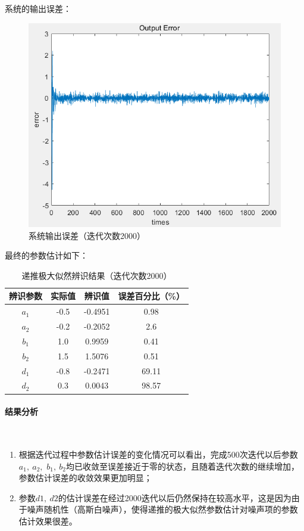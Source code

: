 \documentclass[UTF8]{article}
\begin{document}
系统的输出误差：
\begin{figure}[H]
    \centering %
    \includegraphics[width=.8\textwidth]{figure/递推极大似然-系统输出误差（迭代次数2000）.png} 
    \caption{系统输出误差（迭代次数2000）} %
\end{figure}

最终的参数估计如下：
\begin{table}[H] %
\centering %
\begin{tabular}{cccc} %
    \toprule %
    辨识参数 & 实际值 & 辨识值 & 误差百分比（\%） \\
    \midrule %
    $a_1$ & -0.5 & -0.4951 & 0.98 \\
    $a_2$ & -0.2 & -0.2052 & 2.6 \\
    $b_1$ & 1.0 & 0.9959 & 0.41 \\
    $b_2$ & 1.5 & 1.5076 & 0.51 \\
    $d_1$ & -0.8 & -0.2471 & 69.11 \\ 
    $d_2$ & 0.3 & 0.0043 & 98.57 \\
    \bottomrule %
\end{tabular}
\caption{递推极大似然辨识结果（迭代次数2000）} %
\end{table}

\paragraph{结果分析}~{}
\begin{enumerate}
    \item 根据迭代过程中参数估计误差的变化情况可以看出，完成500次迭代以后参数$a_1,\ a_2,$ $ b_1,\ b_2$均已收敛至误差接近于零的状态，且随着迭代次数的继续增加，参数估计误差的收敛效果更加明显；
    \item 参数$d1,\ d2$的估计误差在经过2000迭代以后仍然保持在较高水平，这是因为由于噪声随机性（高斯白噪声），使得递推的极大似然参数估计对噪声项的参数估计效果很差。
\end{enumerate}
\end{document}
